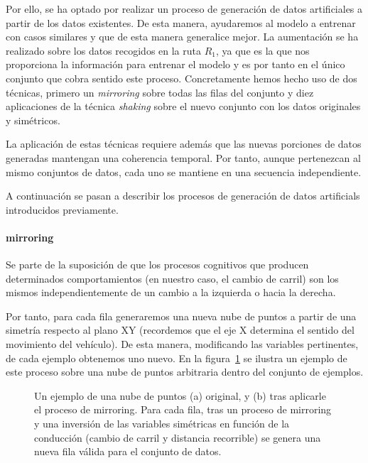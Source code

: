Por ello, se ha optado por realizar un proceso de generación de datos artificiales a partir de los datos existentes. De esta manera, ayudaremos al modelo a entrenar con casos similares y que de esta manera generalice mejor. La aumentación se ha realizado sobre los datos recogidos en la ruta $R_1$, ya que es la que nos proporciona la información para entrenar el modelo y es por tanto en el único conjunto que cobra sentido este proceso. Concretamente hemos hecho uso de dos técnicas, primero un \textit{mirroring} sobre todas las filas del conjunto y diez aplicaciones de la técnica \textit{shaking} sobre el nuevo conjunto con los datos originales y simétricos.

La aplicación de estas técnicas requiere además que las nuevas porciones de datos generadas mantengan una coherencia temporal. Por tanto, aunque pertenezcan al mismo conjuntos de datos, cada uno se mantiene en una secuencia independiente.

A continuación se pasan a describir los procesos de generación de datos artificials introducidos previamente.

\paragraph{mirroring}

Se parte de la suposición de que los procesos cognitivos que producen determinados comportamientos (en nuestro caso, el cambio de carril) son los mismos independientemente de un cambio a la izquierda o hacia la derecha.

Por tanto, para cada fila generaremos una nueva nube de puntos a partir de una simetría respecto al plano XY (recordemos que el eje X determina el sentido del movimiento del vehículo). De esta manera, modificando las variables pertinentes, de cada ejemplo obtenemos uno nuevo. En la figura~\ref{fig:mirroring-example} se ilustra un ejemplo de este proceso sobre una nube de puntos arbitraria dentro del conjunto de ejemplos.

\begin{figure}
	\centering
	\qquad
	\caption[Ejemplo de la técnica de \textit{mirroring}]{Un ejemplo de una nube de puntos (a) original, y (b) tras aplicarle el proceso de mirroring. Para cada fila, tras un proceso de mirroring y una inversión de las variables simétricas en función de la conducción (cambio de carril y distancia recorrible) se genera una nueva fila válida para el conjunto de datos.}
	\label{fig:mirroring-example}
\end{figure}

